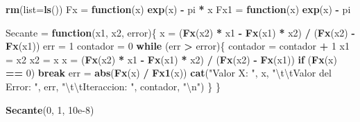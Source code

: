 \documentclass[]{article}
\newenvironment{Shaded}{\begin{snugshade}}{\end{snugshade}}
\newcommand{\CharTok}[1]{\textcolor[rgb]{0.31,0.60,0.02}{#1}}
\newcommand{\ControlFlowTok}[1]{\textcolor[rgb]{0.13,0.29,0.53}{\textbf{#1}}}
\newcommand{\DataTypeTok}[1]{\textcolor[rgb]{0.13,0.29,0.53}{#1}}
\newcommand{\DecValTok}[1]{\textcolor[rgb]{0.00,0.00,0.81}{#1}}
\newcommand{\FloatTok}[1]{\textcolor[rgb]{0.00,0.00,0.81}{#1}}
\newcommand{\KeywordTok}[1]{\textcolor[rgb]{0.13,0.29,0.53}{\textbf{#1}}}
\newcommand{\NormalTok}[1]{#1}
\newcommand{\OperatorTok}[1]{\textcolor[rgb]{0.81,0.36,0.00}{\textbf{#1}}}
\newcommand{\StringTok}[1]{\textcolor[rgb]{0.31,0.60,0.02}{#1}}
\begin{document}
\begin{Shaded}
\begin{Highlighting}[]
\KeywordTok{rm}\NormalTok{(}\DataTypeTok{list=}\KeywordTok{ls}\NormalTok{())}
\NormalTok{Fx =}\StringTok{ }\ControlFlowTok{function}\NormalTok{(x) }\KeywordTok{exp}\NormalTok{(x) }\OperatorTok{-}\StringTok{ }\NormalTok{pi }\OperatorTok{*}\StringTok{ }\NormalTok{x}
\NormalTok{Fx1 =}\StringTok{ }\ControlFlowTok{function}\NormalTok{(x) }\KeywordTok{exp}\NormalTok{(x) }\OperatorTok{-}\StringTok{ }\NormalTok{pi}

\NormalTok{Secante =}\StringTok{ }\ControlFlowTok{function}\NormalTok{(x1, x2, error)\{}
\NormalTok{  x =}\StringTok{ }\NormalTok{(}\KeywordTok{Fx}\NormalTok{(x2) }\OperatorTok{*}\StringTok{ }\NormalTok{x1 }\OperatorTok{-}\StringTok{ }\KeywordTok{Fx}\NormalTok{(x1) }\OperatorTok{*}\StringTok{ }\NormalTok{x2) }\OperatorTok{/}\StringTok{ }\NormalTok{(}\KeywordTok{Fx}\NormalTok{(x2) }\OperatorTok{-}\StringTok{ }\KeywordTok{Fx}\NormalTok{(x1))}
\NormalTok{  err =}\StringTok{ }\DecValTok{1}
\NormalTok{  contador =}\StringTok{ }\DecValTok{0}
  \ControlFlowTok{while}\NormalTok{ (err }\OperatorTok{>}\StringTok{ }\NormalTok{error)\{}
\NormalTok{    contador =}\StringTok{ }\NormalTok{contador }\OperatorTok{+}\StringTok{ }\DecValTok{1}
\NormalTok{    x1 =}\StringTok{ }\NormalTok{x2}
\NormalTok{    x2 =}\StringTok{ }\NormalTok{x}
\NormalTok{    x =}\StringTok{ }\NormalTok{(}\KeywordTok{Fx}\NormalTok{(x2) }\OperatorTok{*}\StringTok{ }\NormalTok{x1 }\OperatorTok{-}\StringTok{ }\KeywordTok{Fx}\NormalTok{(x1) }\OperatorTok{*}\StringTok{ }\NormalTok{x2) }\OperatorTok{/}\StringTok{ }\NormalTok{(}\KeywordTok{Fx}\NormalTok{(x2) }\OperatorTok{-}\StringTok{ }\KeywordTok{Fx}\NormalTok{(x1))}
    \ControlFlowTok{if}\NormalTok{ (}\KeywordTok{Fx}\NormalTok{(x) }\OperatorTok{==}\StringTok{ }\DecValTok{0}\NormalTok{)}
      \ControlFlowTok{break}
\NormalTok{    err =}\StringTok{ }\KeywordTok{abs}\NormalTok{(}\KeywordTok{Fx}\NormalTok{(x) }\OperatorTok{/}\StringTok{ }\KeywordTok{Fx1}\NormalTok{(x))}
    \KeywordTok{cat}\NormalTok{(}\StringTok{"Valor X: "}\NormalTok{, x, }\StringTok{"}\CharTok{\textbackslash{}t\textbackslash{}t}\StringTok{Valor del Error: "}\NormalTok{, err, }\StringTok{"}\CharTok{\textbackslash{}t\textbackslash{}t}\StringTok{Iteraccion: "}\NormalTok{, contador, }\StringTok{"}\CharTok{\textbackslash{}n}\StringTok{"}\NormalTok{)}
\NormalTok{  \}}
\NormalTok{\}}

\KeywordTok{Secante}\NormalTok{(}\DecValTok{0}\NormalTok{, }\DecValTok{1}\NormalTok{, }\FloatTok{10e-8}\NormalTok{)}
\end{Highlighting}
\end{Shaded}
\end{document}
